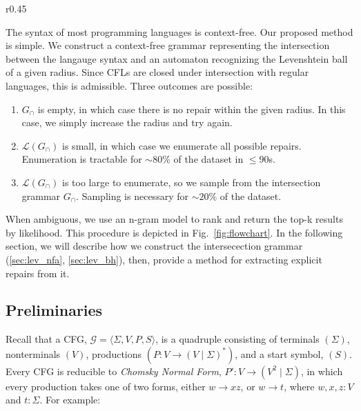 \documentclass[sigplan,review,anonymous,acmsmall]{acmart}\settopmatter{printfolios=false,printccs=false,printacmref=false}
\begin{document}
\begin{wrapfigure}{r}{0.45\textwidth}
\begin{center}
{
      }
    \end{center}
    \caption{Flowchart of our proposed method.}\label{fig:flowchart}
    \vspace{-1cm}
  \end{wrapfigure}

  The syntax of most programming languages is context-free. Our proposed method is simple. We construct a context-free grammar representing the intersection between the langauge syntax and an automaton recognizing the Levenshtein ball of a given radius. Since CFLs are closed under intersection with regular languages, this is admissible. Three outcomes are possible:

  \begin{enumerate}
    \item $G_\cap$ is empty, in which case there is no repair within the given radius. In this case, we simply increase the radius and try again.
    \item $\mathcal{L}(G_\cap)$ is small, in which case we enumerate all possible repairs. Enumeration is tractable for $\sim 80\%$ of the dataset in $\leq 90$s.
    \item $\mathcal{L}(G_\cap)$ is too large to enumerate, so we sample from the intersection grammar $G_\cap$. Sampling is necessary for $\sim20\%$ of the dataset.
  \end{enumerate}

  When ambiguous, we use an n-gram model to rank and return the top-k results by likelihood. This procedure is depicted in Fig.~\ref{fig:flowchart}. In the following section, we will describe how we construct the intersecection grammar (\ref{sec:lev_nfa}, \ref{sec:lev_bh}), then, provide a method for extracting explicit repairs from it.

  \subsection{Preliminaries}

  Recall that a CFG, $\mathcal{G} = \langle \Sigma, V, P, S\rangle$, is a quadruple consisting of terminals $(\Sigma)$, nonterminals $(V)$, productions $(P\colon V \rightarrow (V \mid \Sigma)^*)$, and a start symbol, $(S)$. Every CFG is reducible to \textit{Chomsky Normal Form}, $P'\colon V \rightarrow (V^2 \mid \Sigma)$, in which every production takes one of two forms, either $w \rightarrow xz$, or $w \rightarrow t$, where $w, x, z: V$ and $t: \Sigma$. For example:\vspace{-3pt}
\end{document}
